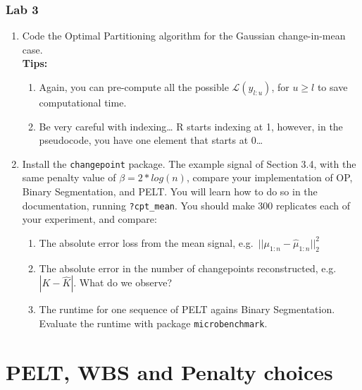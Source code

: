 \documentclass[
  letterpaper,
  DIV=11,
  numbers=noendperiod]{scrreprt}
\begin{document}
\subsection{Lab 3}\label{lab-3}

\begin{enumerate}
\def\labelenumi{\arabic{enumi}.}
\item
  Code the Optimal Partitioning algorithm for the Gaussian
  change-in-mean case.\\
  \textbf{Tips:}

  \begin{enumerate}
  \def\labelenumii{\alph{enumii}.}
  \item
    Again, you can pre-compute all the possible
    \(\mathcal{L}(y_{l:u})\), for \(u \geq l\) to save computational
    time.
  \item
    Be very careful with indexing\ldots{} R starts indexing at 1,
    however, in the pseudocode, you have one element that starts at
    0\ldots{}
  \end{enumerate}
\item
  Install the \texttt{changepoint} package. The example signal of
  Section 3.4, with the same penalty value of \(\beta = 2 * log(n)\),
  compare your implementation of OP, Binary Segmentation, and PELT. You
  will learn how to do so in the documentation, running
  \texttt{?cpt\_mean}. You should make 300 replicates each of your
  experiment, and compare:

  \begin{enumerate}
  \def\labelenumii{\alph{enumii}.}
  \item
    The absolute error loss from the mean signal,
    e.g.~\(||\mu_{1:n} - \hat{\mu}_{1:n}||^2_2\)
  \item
    The absolute error in the number of changepoints reconstructed,
    e.g.~\(|K - \hat{K}|\). What do we observe?
  \item
    The runtime for one sequence of PELT agains Binary Segmentation.
    Evaluate the runtime with package \texttt{microbenchmark}.
  \end{enumerate}
\end{enumerate}


\chapter{PELT, WBS and Penalty
choices}\label{pelt-wbs-and-penalty-choices}
\end{document}
